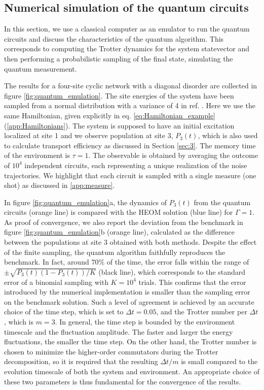 \documentclass[12pt, amsmath, amssymb, graphicx]{iopart}
\begin{document}
\subsection{\label{subsec:Quantum emulation}Numerical simulation of the quantum circuits}
In this section, we use a classical computer as an emulator to run the quantum circuits and discuss the characteristics of the quantum algorithm. This corresponds to computing the Trotter dynamics for the system statevector and then performing a probabilistic sampling of the final state, simulating the quantum measurement.

The results for a four-site cyclic network with a diagonal disorder are collected in figure \ref{fig:quantum_emulation}.
The site energies of the system have been sampled from a normal distribution with a variance of 4 in ref. \cite{Gallina2022}. Here we use the same Hamiltonian, given explicitly in eq. \ref{eq:Hamiltonian_example} (\ref{app:Hamiltonians}).
The system is supposed to have an initial excitation localized at site 1 and we observe population at site 3, $P_3(t)$, which is also used to calculate transport efficiency as discussed in Section \ref{sec:3}.
The memory time of the environment is $\tau = 1$.
The observable is obtained by averaging the outcome of $10^4$ independent circuits, each representing a unique realization of the noise trajectories.
We highlight that each circuit is sampled with a single measure (one shot) as discussed in \ref{app:measure}.

In figure \ref{fig:quantum_emulation}a, the dynamics of $P_3(t)$ from the quantum circuits (orange line) is compared with the HEOM solution (blue line) for $\Gamma = 1$.
As proof of convergence, we also report the deviation from the benchmark in figure \ref{fig:quantum_emulation}b (orange line), calculated as the difference between the populations at site 3 obtained with both methods.
Despite the effect of the finite sampling, the quantum algorithm faithfully reproduces the benchmark.
In fact, around 70\% of the time, the error falls within the range of $\pm \sqrt{P_3(t)\left( 1 - P_3(t) \right) / K}$ (black line),  which corresponds to the standard error of a binomial sampling with $K = 10^4$ trials.
This confirms that the error introduced by the numerical implementation is smaller than the sampling error on the benchmark solution.
Such a level of agreement is achieved by an accurate choice of the time step, which is set to $\Delta t = 0.05$, and the Trotter number per $\Delta t$, which is $m = 3$.
In general, the time step is bounded by the environment timescale and the fluctuation amplitude. The faster and larger the energy fluctuations, the smaller the time step.
On the other hand, the Trotter number is chosen to minimize the higher-order commutators during the Trotter decomposition, so it is required that the resulting $\Delta t / m$ is small compared to the evolution timescale of both the system and environment.
An appropriate choice of these two parameters is thus fundamental for the convergence of the results.
\end{document}
